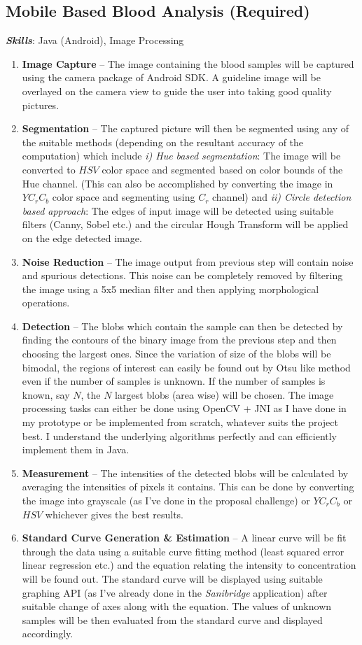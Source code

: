 \documentclass[runningheads,a4paper]{llncs}
\begin{document}
\subsection{Mobile Based Blood Analysis (Required)}

\textbf{\emph{Skills}}: Java (Android), Image Processing 

\begin{enumerate}
\item \textbf{Image Capture} -- The image containing the blood samples will be captured using the camera package of Android SDK. A guideline image will be overlayed on the camera view to guide the user into taking good quality pictures.
\item \textbf{Segmentation} -- The captured picture will then be segmented using any of the suitable methods (depending on the resultant accuracy of the computation) which include \emph{i) Hue based segmentation}: The image will be converted to $HSV$ color space and segmented based on color bounds of the Hue channel. (This can also be accomplished by converting the image in $YC_{r}C_{b}$ color space and segmenting using $C_{r}$ channel) and \emph{ii) Circle detection based approach}: The edges of input image will be detected using suitable filters (Canny, Sobel etc.) and the circular Hough Transform will be applied on the edge detected image. 
\item \textbf{Noise Reduction} -- The image output from previous step will contain noise and spurious detections. This noise can be completely removed by filtering the image using a 5x5 median filter and then applying morphological operations.
\item \textbf{Detection} -- The blobs which contain the sample can then be detected by finding the contours of the binary image from the previous step and then choosing the largest ones. Since the variation of size of the blobs will be bimodal, the regions of interest can easily be found out by Otsu like method even if the number of samples is unknown. If the number of samples is known, say $N$, the $N$ largest blobs (area wise) will be chosen. The image processing tasks can either be done using OpenCV + JNI as I have done in my prototype or be implemented from scratch, whatever suits the project best. I understand the underlying algorithms perfectly and can efficiently implement them in Java. 
\item \textbf{Measurement} -- The intensities of the detected blobs will be calculated by averaging the intensities of pixels it contains. This can be done by converting the image into grayscale (as I've done in the proposal challenge) or $YC_{r}C_{b}$ or $HSV$ whichever gives the best results.
\item \textbf{Standard Curve Generation \& Estimation} -- A linear curve will be fit through the data using a suitable curve fitting method (least squared error linear regression etc.) and the equation relating the intensity to concentration will be found out. The standard curve will be displayed using suitable graphing API (as I've already done in the \emph{Sanibridge} application) after suitable change of axes along with the equation. The values of unknown samples will be then evaluated from the standard curve and displayed accordingly.


\end{enumerate}
\end{document}
